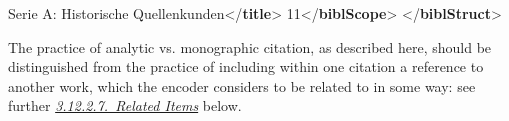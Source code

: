 \begin{shaded}
\hspace*{1em}Serie A: Historische Quellenkunden{</\textbf{title}>}\mbox{}\newline 
\hspace*{1em}11{</\textbf{biblScope}>}\mbox{}\newline 
{}\mbox{}\newline 
{</\textbf{biblStruct}>}\end{shaded}\egroup\par \par
The practice of analytic vs. monographic citation, as described here, should be distinguished from the practice of including within one citation a reference to another work, which the encoder considers to be related to in some way: see further \textit{\hyperref[COBIRI]{3.12.2.7.\ Related Items}} below.\par
